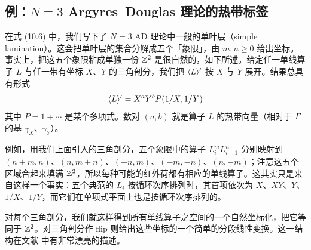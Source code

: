 \subsection{例：$N=3$ Argyres--Douglas 理论的热带标签}

在式 (10.6)%
中，我们写下了 $N=3$ AD 理论中一般的单叶层（simple lamination）。这会把单叶层的集合分解成五个「象限」，由 $m,n\ge 0$ 给出坐标。事实上，把这五个象限粘成单独一份 $\mathbb{Z}^2$ 是很自然的，如下所述。给定任一单线算子 $L$ 与任一带有坐标 $X$、$Y$ 的三角剖分，我们把 $\langle L \rangle'$ 按 $X$ 与 $Y$ 展开。结果总具有形式
\begin{equation}
\langle L \rangle' = X^a Y^b P(1/X,1/Y)
\end{equation}
其中 $P=1+\cdots$ 是某个多项式。数对 $(a,b)$ 就是算子 $L$ 的热带向量（相对于 $\Gamma$ 的基 $\gamma_X$、$\gamma_Y$）。

例如，用我们上面引入的三角剖分，五个象限中的算子 $L_i^m L_{i+1}^n$ 分别映射到 $(n+m,n)$、$(n,m+n)$、$(-n,m)$、$(-m,-n)$、$(n,-m)$；注意这五个区域合起来填满 $\mathbb{Z}^2$，所以每种可能的红外荷都有相应的单线算子。这其实只是来自这样一个事实：五个典范的 $L_i$ 按循环次序排列时，其首项依次为 $X$、$XY$、$Y$、$1/X$、$1/Y$，而它们在单项式平面上也是按循环次序排列的。

对每个三角剖分，我们就这样得到所有单线算子之空间的一个自然坐标化，把它等同于 $\mathbb{Z}^2$。对三角剖分作 flip 则给出这些坐标的一个简单的分段线性变换。这一结构在文献 \cite{qd-pentagon} 中有非常漂亮的描述。
